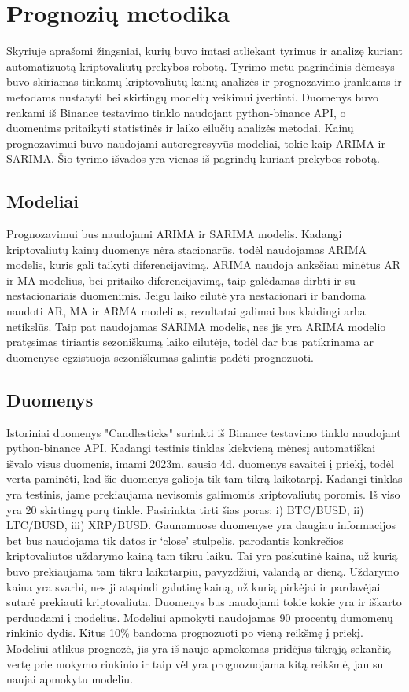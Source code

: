 \documentclass{VUMIFInfKursinis}
\begin{document}
\section{Prognozių metodika}

Skyriuje aprašomi žingsniai, kurių buvo imtasi atliekant tyrimus ir analizę kuriant automatizuotą kriptovaliutų prekybos robotą. 
Tyrimo metu pagrindinis dėmesys buvo skiriamas tinkamų kriptovaliutų kainų analizės ir prognozavimo įrankiams ir metodams nustatyti bei skirtingų modelių veikimui įvertinti. 
Duomenys buvo renkami iš Binance testavimo tinklo naudojant python-binance API, o duomenims pritaikyti statistinės ir laiko eilučių analizės metodai. 
Kainų prognozavimui buvo naudojami autoregresyvūs modeliai, tokie kaip ARIMA ir SARIMA. 
Šio tyrimo išvados yra vienas iš pagrindų kuriant prekybos robotą.

\subsection{Modeliai}
Prognozavimui bus naudojami ARIMA ir SARIMA modelis. Kadangi kriptovaliutų kainų duomenys nėra stacionarūs, todėl naudojamas ARIMA modelis, kuris gali taikyti diferencijavimą.
ARIMA naudoja anksčiau minėtus AR ir MA modelius, bei pritaiko diferencijavimą, taip galėdamas dirbti ir su nestacionariais duomenimis. 
Jeigu laiko eilutė yra nestacionari ir bandoma naudoti AR, MA ir ARMA modelius, rezultatai galimai bus klaidingi arba netikslūs.
Taip pat naudojamas SARIMA modelis, nes jis yra ARIMA modelio pratęsimas tiriantis sezoniškumą laiko eilutėje, todėl dar bus patikrinama ar duomenyse egzistuoja sezoniškumas
galintis padėti prognozuoti.

\subsection{Duomenys}
Istoriniai duomenys "Candlesticks" surinkti iš Binance testavimo tinklo naudojant python-binance API. Kadangi testinis tinklas kiekvieną mėnesį automatiškai 
išvalo visus duomenis, imami 2023m. sausio 4d. duomenys savaitei į priekį, todėl verta paminėti, kad šie duomenys galioja tik tam tikrą laikotarpį. 
Kadangi tinklas yra testinis, jame prekiaujama nevisomis galimomis kriptovaliutų poromis. Iš viso yra 20 skirtingų porų tinkle. Pasirinkta tirti šias poras: 
i) BTC/BUSD, ii) LTC/BUSD, iii) XRP/BUSD.
Gaunamuose duomenyse yra daugiau informacijos bet bus naudojama tik datos ir `close' stulpelis, parodantis konkrečios kriptovaliutos uždarymo kainą tam tikru laiku. Tai yra paskutinė 
kaina, už kurią buvo prekiaujama tam tikru laikotarpiu, pavyzdžiui, valandą ar dieną. Uždarymo kaina yra svarbi, nes ji atspindi galutinę kainą, už kurią pirkėjai ir pardavėjai
sutarė prekiauti kriptovaliuta. Duomenys bus naudojami tokie kokie yra ir iškarto perduodami į modelius. Modeliui apmokyti naudojamas 90 procentų dumomenų rinkinio dydis.
Kitus 10\% bandoma prognozuoti po vieną reikšmę į priekį. Modeliui atlikus prognozė, jis yra iš naujo apmokomas pridėjus tikrąją sekančią vertę prie mokymo rinkinio ir
taip vėl yra prognozuojama kitą reikšmė, jau su naujai apmokytu modeliu.
\end{document}
